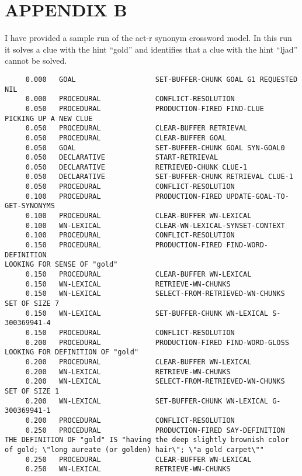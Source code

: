 \headsep 0.8in
\section*{APPENDIX B}
I have provided a sample run of the act-r synonym crossword model. In this run it solves a clue with the hint ``gold'' and identifies that a clue with the hint ``ljad'' cannot be solved.

\begin{verbatim}
     0.000   GOAL                   SET-BUFFER-CHUNK GOAL G1 REQUESTED NIL 
     0.000   PROCEDURAL             CONFLICT-RESOLUTION 
     0.050   PROCEDURAL             PRODUCTION-FIRED FIND-CLUE 
PICKING UP A NEW CLUE 
     0.050   PROCEDURAL             CLEAR-BUFFER RETRIEVAL 
     0.050   PROCEDURAL             CLEAR-BUFFER GOAL 
     0.050   GOAL                   SET-BUFFER-CHUNK GOAL SYN-GOAL0 
     0.050   DECLARATIVE            START-RETRIEVAL 
     0.050   DECLARATIVE            RETRIEVED-CHUNK CLUE-1 
     0.050   DECLARATIVE            SET-BUFFER-CHUNK RETRIEVAL CLUE-1 
     0.050   PROCEDURAL             CONFLICT-RESOLUTION 
     0.100   PROCEDURAL             PRODUCTION-FIRED UPDATE-GOAL-TO-GET-SYNONYMS 
     0.100   PROCEDURAL             CLEAR-BUFFER WN-LEXICAL 
     0.100   WN-LEXICAL             CLEAR-WN-LEXICAL-SYNSET-CONTEXT 
     0.100   PROCEDURAL             CONFLICT-RESOLUTION 
     0.150   PROCEDURAL             PRODUCTION-FIRED FIND-WORD-DEFINITION 
LOOKING FOR SENSE OF "gold" 
     0.150   PROCEDURAL             CLEAR-BUFFER WN-LEXICAL 
     0.150   WN-LEXICAL             RETRIEVE-WN-CHUNKS 
     0.150   WN-LEXICAL             SELECT-FROM-RETRIEVED-WN-CHUNKS SET OF SIZE 7 
     0.150   WN-LEXICAL             SET-BUFFER-CHUNK WN-LEXICAL S-300369941-4 
     0.150   PROCEDURAL             CONFLICT-RESOLUTION 
     0.200   PROCEDURAL             PRODUCTION-FIRED FIND-WORD-GLOSS 
LOOKING FOR DEFINITION OF "gold" 
     0.200   PROCEDURAL             CLEAR-BUFFER WN-LEXICAL 
     0.200   WN-LEXICAL             RETRIEVE-WN-CHUNKS 
     0.200   WN-LEXICAL             SELECT-FROM-RETRIEVED-WN-CHUNKS SET OF SIZE 1 
     0.200   WN-LEXICAL             SET-BUFFER-CHUNK WN-LEXICAL G-300369941-1 
     0.200   PROCEDURAL             CONFLICT-RESOLUTION 
     0.250   PROCEDURAL             PRODUCTION-FIRED SAY-DEFINITION 
THE DEFINITION OF "gold" IS "having the deep slightly brownish color of gold; \"long aureate (or golden) hair\"; \"a gold carpet\"" 
     0.250   PROCEDURAL             CLEAR-BUFFER WN-LEXICAL 
     0.250   WN-LEXICAL             RETRIEVE-WN-CHUNKS 

\end{verbatim}
